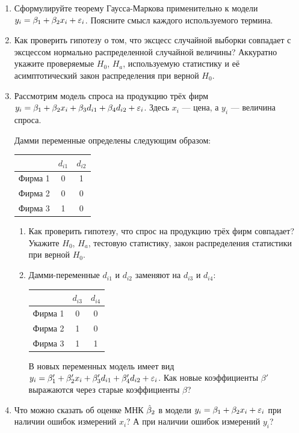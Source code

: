 \documentclass[12pt, a4paper]{article}
\begin{document}
\begin{enumerate}
\item Сформулируйте теорему Гаусса-Маркова применительно к модели $y_i=\beta_1+\beta_2 x_i +\varepsilon_i$. Поясните смысл каждого используемого термина.

\item Как проверить гипотезу о том, что эксцесс случайной выборки совпадает с эксцессом нормально распределенной случайной величины? Аккуратно укажите проверяемые $H_0$, $H_a$, используемую статистику и её асимптотический закон распределения при верной $H_0$.

\item Рассмотрим модель спроса на продукцию трёх фирм $y_i=\beta_1+\beta_2 x_i +\beta_3 d_{i1} + \beta_4 d_{i2} + \varepsilon_i$. Здесь $x_i$ — цена, а $y_i$ — величина спроса.

Дамми переменные определены следующим образом:

\begin{tabular}{ccc}
 & $d_{i1}$ & $d_{i2}$  \\
\hline
Фирма 1 & 0 & 1  \\
Фирма 2 & 0 & 0  \\
Фирма 3 & 1 & 0  \\
\end{tabular}

\begin{enumerate}
\item Как проверить гипотезу, что спрос на продукцию трёх фирм совпадает? Укажите $H_0$, $H_a$, тестовую статистику, закон распределения статистики при верной $H_0$.
\item Дамми-переменные $d_{i1}$ и $d_{i2}$ заменяют на $d_{i3}$ и $d_{i4}$:

\begin{tabular}{ccc}
  & $d_{i3}$ & $d_{i4}$ \\
\hline
Фирма 1 &  0 & 0 \\
Фирма 2 &  1 & 0 \\
Фирма 3 &  1 & 1 \\
\end{tabular}


В новых переменных модель имеет вид $y_i=\beta_1'+\beta_2' x_i +\beta_3' d_{i1} + \beta_4' d_{i2} + \varepsilon_i$. Как новые коэффициенты $\beta'$ выражаются через старые коэффициенты $\beta$?
\end{enumerate}



\item Что можно сказать об оценке МНК $\hat{\beta}_2$  в модели $y_i=\beta_1+\beta_2 x_i +\varepsilon_i$ при наличии ошибок измерений $x_i$? А при наличии ошибок измерений $y_i$?


\end{enumerate}
\end{document}
